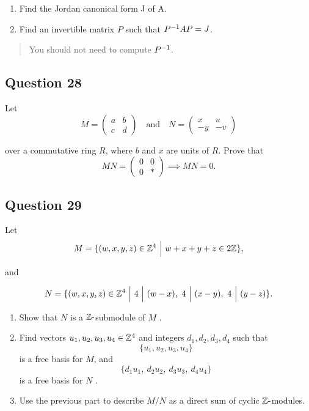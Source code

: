 \documentclass[12pt]{article}
\begin{document}
\begin{enumerate}
\def\labelenumi{(\alph{enumi})}
\item
  Find the Jordan canonical form J of A.
\item
  Find an invertible matrix \(P\) such that \(P^{-1} AP = J\).
\end{enumerate}

\begin{quote}
You should not need to compute \(P^{-1}\).
\end{quote}

\hypertarget{question-28}{%
\subsection{Question 28}\label{question-28}}

Let \[
M=\left(\begin{array}{ll}{a} & {b} \\ {c} & {d}\end{array}\right)
\quad \text{and} \quad 
N=\left(\begin{array}{cc}{x} & {u} \\ {-y} & {-v}\end{array}\right)
\]

over a commutative ring \(R\), where \(b\) and \(x\) are units of \(R\).
Prove that \[
M N=\left(\begin{array}{ll}{0} & {0} \\ {0} & {*}\end{array}\right)
\implies MN = 0
.\]

\hypertarget{question-29}{%
\subsection{Question 29}\label{question-29}}

Let \[
M = \{(w, x, y, z) \in {\mathbb{Z}}^4 {~\mathrel{\Big|}~} w + x + y + z \in 2{\mathbb{Z}}\}
,\]

and

\[
N = \{(w, x, y, z) \in {\mathbb{Z}}^4 {~\mathrel{\Big|}~} 4{~\Bigm|~} (w - x),~ 4{~\Bigm|~} (x - y),~ 4{~\Bigm|~} ( y - z)\}
.\]

\begin{enumerate}
\def\labelenumi{(\alph{enumi})}
\item
  Show that \(N\) is a \({\mathbb{Z}}{\hbox{-}}\)submodule of \(M\) .
\item
  Find vectors \(u_1 , u_2 , u_3 , u_4 \in {\mathbb{Z}}^4\) and integers
  \(d_1 , d_2 , d_3 , d_4\) such that \[
  \{u_1 , u_2 , u_3 , u_4 \}
  \] is a free basis for \(M\), and \[
  \{d_1 u_1,~ d_2 u_2,~ d_3 u_3,~ d_4 u_4 \}
  \] is a free basis for \(N\) .
\item
  Use the previous part to describe \(M/N\) as a direct sum of cyclic
  \({\mathbb{Z}}{\hbox{-}}\)modules.
\end{enumerate}
\end{document}
